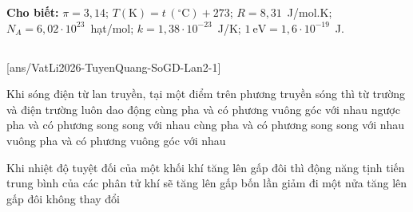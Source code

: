\def\CheDo{solcolor}%
\def\tenchuong{Sở GD\&ĐT Tuyên Quang -- Lần 2}
\def\thuonghieu{VẬT LÍ 12 -- Eduzy.com.vn}
\def\TachCauDS{1}
\def\TachCauLG{1}


\newcommand{\VLdaydong}[1]{\draw[VLdong!50!black,line width=2pt] #1; \draw[VLdong!30!white,line width=0.75pt] #1;}


	\noindent\textbf{Cho biết:} $\pi=3{,}14$; $T(\text{K})=t\,(^\circ\text{C})+273$; $R=8{,}31$~J/mol.K; $N_A=6{,}02\cdot 10^{23}$~hạt/mol; $k=1{,}38\cdot 10^{-23}$~J/K; $1~\text{eV}=1{,}6\cdot 10^{-19}$~J.

	\noindent
	\subsection*{}
	\setcounter{ex}{0}
	[ans/VatLi2026-TuyenQuang-SoGD-Lan2-1]

	\begin{ex}%
		Khi sóng điện từ lan truyền, tại một điểm trên phương truyền sóng thì từ trường và điện trường luôn dao động
		\choice
		{\True cùng pha và có phương vuông góc với nhau}
		{ngược pha và có phương song song với nhau}
		{cùng pha và có phương song song với nhau}
		{vuông pha và có phương vuông góc với nhau}
	\end{ex}

	\begin{ex}%
		Khi nhiệt độ tuyệt đối của một khối khí tăng lên gấp đôi thì động năng tịnh tiến trung bình của các phân tử khí sẽ
		\choice
		{tăng lên gấp bốn lần}
		{giảm đi một nửa}
		{\True tăng lên gấp đôi}
		{không thay đổi}
	\end{ex}

